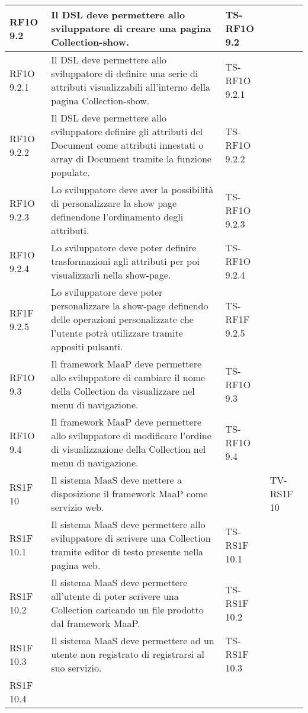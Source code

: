 \begin{center}
\begin{longtable}{| p{2cm} | p{6cm} | p{2.5cm} | p{2.5cm} | }
        RF1O 9.2 & 
        Il DSL deve permettere allo sviluppatore di creare una pagina Collection-show. & TS-RF1O 9.2 & \\ \hline 
        RF1O 9.2.1 & 
        Il DSL deve permettere allo sviluppatore di definire una serie di attributi visualizzabili all’interno della pagina Collection-show. & TS-RF1O 9.2.1 & \\ \hline 
        RF1O 9.2.2 & 
        Il DSL deve permettere allo sviluppatore definire gli attributi del Document come attributi innestati o array di Document tramite la funzione populate. & TS-RF1O 9.2.2 & \\ \hline 
        RF1O 9.2.3 & 
        Lo sviluppatore deve aver la possibilità di personalizzare la show page definendone l’ordinamento degli attributi. & TS-RF1O 9.2.3 & \\ \hline 
        RF1O 9.2.4 & 
        Lo sviluppatore deve poter definire trasformazioni agli attributi per poi visualizzarli nella show-page. & TS-RF1O 9.2.4 & \\ \hline 
        RF1F 9.2.5 & 
        Lo sviluppatore deve poter personalizzare la show-page definendo delle operazioni personalizzate che l’utente potrà utilizzare tramite appositi pulsanti. & TS-RF1F 9.2.5 & \\ \hline 
        RF1O 9.3 & 
        Il framework MaaP deve permettere allo sviluppatore di cambiare il nome della Collection da visualizzare nel menu di navigazione. & TS-RF1O 9.3 & \\ \hline 
        RF1O 9.4 & 
        Il framework MaaP deve permettere allo sviluppatore di modificare l’ordine di visualizzazione della Collection nel menu di navigazione. & TS-RF1O 9.4 & \\ \hline 
        RS1F 10 & 
        Il sistema MaaS deve mettere a disposizione il framework MaaP come servizio web. &  & TV-RS1F 10 \\ \hline 
        RS1F 10.1 & 
        Il sistema MaaS deve permettere allo sviluppatore di scrivere una Collection tramite editor di testo presente nella pagina web. & TS-RS1F 10.1 & \\ \hline 
        RS1F 10.2 & 
        Il sistema MaaS deve permettere all’utente di poter scrivere una Collection caricando un file prodotto dal framework MaaP. & TS-RS1F 10.2 & \\ \hline 
        RS1F 10.3 & 
        Il sistema MaaS deve permettere ad un utente non registrato di registrarsi al suo servizio. & TS-RS1F 10.3 & \\ \hline 
        RS1F 10.4 & 

\end{longtable}
\end{center}

